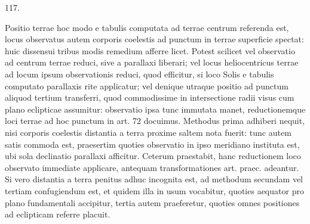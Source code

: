 \par\medskip
\begin{center}\hypertarget{native-164-article117}{}117.\end{center}
Positio terrae hoc modo e tabulis computata ad terrae centrum referenda est, locus observatus autem corporis coelestis ad punctum in terrae superficie spectat: huic dissensui tribus modis remedium afferre licet. Potest scilicet vel observatio ad centrum terrae reduci, sive a parallaxi liberari; vel locus heliocentricus terrae ad locum ipsum observationis reduci, quod efficitur, si loco Solis e tabulis computato parallaxis rite applicatur; vel denique utraque positio ad punctum aliquod tertium transferri, quod commodissime in intersectione radii visus cum plano eclipticae assumitur: observatio ipsa tunc immutata manet, reductionemque loci terrae ad hoc punctum in art. 72 docuimus. Methodus prima adhiberi nequit, nisi corporis coelestis distantia a terra proxime saltem nota fuerit: tunc autem satis commoda est, praesertim quoties observatio in ipso meridiano instituta est, ubi sola declinatio parallaxi afficitur. Ceterum praestabit, hanc reductionem loco observato immediate applicare, antequam transformationes art. praec. adeantur. Si vero distantia a terra penitus adhuc incognita est, ad methodum secundam vel tertiam confugiendum est, et quidem illa in usum vocabitur, quoties aequator pro plano fundamentali accipitur, tertia autem praeferetur, quoties omnes positiones ad eclipticam referre placuit.

